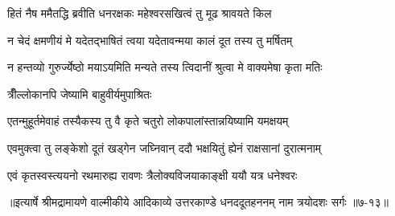 \twolineshloka
{हितं नैष ममैतद्धि ब्रवीति धनरक्षकः}
{महेश्वरसखित्वं तु मूढ श्रावयते किल} %

\twolineshloka
{न चेदं क्षमणीयं मे यदेतद्भाषितं त्वया}
{यदेतावन्मया कालं दूत तस्य तु मर्षितम्} %

\twolineshloka
{न हन्तव्यो गुरुर्ज्येष्ठो मयाऽयमिति मन्यते}
{तस्य त्विदानीं श्रुत्वा मे वाक्यमेषा कृता मतिः} %

\onelineshloka
{त्रीँल्लोकानपि जेष्यामि बाहुवीर्यमुपाश्रितः} %

\twolineshloka
{एतन्मुहूर्तमेवाहं तस्यैकस्य तु वै कृते}
{चतुरो लोकपालांस्तान्नयिष्यामि यमक्षयम्} %

\twolineshloka
{एवमुक्त्वा तु लङ्केशो दूतं खड्गेन जघ्निवान्}
{ददौ भक्षयितुं ह्येनं राक्षसानां दुरात्मनाम्} %

\twolineshloka
{एवं कृतस्वस्त्ययनो रथमारुह्य रावणः}
{त्रैलोक्यविजयाकाङ्क्षी ययौ यत्र धनेश्वरः} %


॥इत्यार्षे श्रीमद्रामायणे वाल्मीकीये आदिकाव्ये उत्तरकाण्डे धनददूतहननम् नाम त्रयोदशः सर्गः ॥७-१३॥
